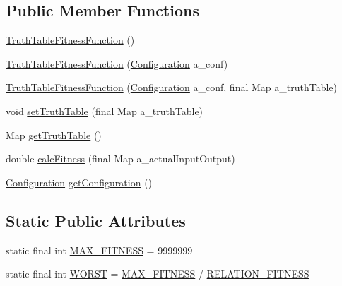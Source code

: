 \subsection*{Public Member Functions}
\begin{DoxyCompactItemize}
\item 
\hyperlink{classorg_1_1jgap_1_1impl_1_1fitness_1_1_truth_table_fitness_function_a721659e73d2468d70ded7979c40e8018}{Truth\-Table\-Fitness\-Function} ()
\item 
\hyperlink{classorg_1_1jgap_1_1impl_1_1fitness_1_1_truth_table_fitness_function_af37b3ed627769e634010544c65eb0130}{Truth\-Table\-Fitness\-Function} (\hyperlink{classorg_1_1jgap_1_1_configuration}{Configuration} a\-\_\-conf)
\item 
\hyperlink{classorg_1_1jgap_1_1impl_1_1fitness_1_1_truth_table_fitness_function_a8aede952ab153b59aff382f8b3c683e5}{Truth\-Table\-Fitness\-Function} (\hyperlink{classorg_1_1jgap_1_1_configuration}{Configuration} a\-\_\-conf, final Map a\-\_\-truth\-Table)
\item 
void \hyperlink{classorg_1_1jgap_1_1impl_1_1fitness_1_1_truth_table_fitness_function_a3474d928cdb3f4c78c68b774c6a664f6}{set\-Truth\-Table} (final Map a\-\_\-truth\-Table)
\item 
Map \hyperlink{classorg_1_1jgap_1_1impl_1_1fitness_1_1_truth_table_fitness_function_aebb74f1e0c020304e28b91cd60f4ec8f}{get\-Truth\-Table} ()
\item 
double \hyperlink{classorg_1_1jgap_1_1impl_1_1fitness_1_1_truth_table_fitness_function_acd41df30587d5553bf61293c0e025051}{calc\-Fitness} (final Map a\-\_\-actual\-Input\-Output)
\item 
\hyperlink{classorg_1_1jgap_1_1_configuration}{Configuration} \hyperlink{classorg_1_1jgap_1_1impl_1_1fitness_1_1_truth_table_fitness_function_a004b96acb0858042d48179a945608d1a}{get\-Configuration} ()
\end{DoxyCompactItemize}
\subsection*{Static Public Attributes}
\begin{DoxyCompactItemize}
\item 
static final int \hyperlink{classorg_1_1jgap_1_1impl_1_1fitness_1_1_truth_table_fitness_function_ad89545f0c14a72e8ce9c5974d77f824a}{M\-A\-X\-\_\-\-F\-I\-T\-N\-E\-S\-S} = 9999999
\item 
static final int \hyperlink{classorg_1_1jgap_1_1impl_1_1fitness_1_1_truth_table_fitness_function_a669cc63856333d085208307ea87a3185}{W\-O\-R\-S\-T} = \hyperlink{classorg_1_1jgap_1_1impl_1_1fitness_1_1_truth_table_fitness_function_ad89545f0c14a72e8ce9c5974d77f824a}{M\-A\-X\-\_\-\-F\-I\-T\-N\-E\-S\-S} / \hyperlink{classorg_1_1jgap_1_1impl_1_1fitness_1_1_truth_table_fitness_function_a596b1525fe57652af58e9589edc7ac3f}{R\-E\-L\-A\-T\-I\-O\-N\-\_\-\-F\-I\-T\-N\-E\-S\-S}
\end{DoxyCompactItemize}
